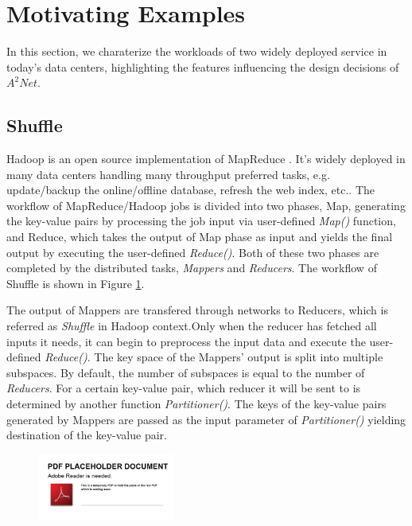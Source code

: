 \section{Motivating Examples}

In this section, we charaterize the workloads of two widely deployed service in today's data centers, highlighting the features influencing the design decisions of $A^2Net$.

\subsection{Shuffle}

Hadoop \cite{Hadoop} is an open source implementation of MapReduce \cite{MapReduce}. It's widely deployed in many data centers handling many throughput preferred tasks, e.g. update/backup the online/offline database, refresh the web index, etc.. The workflow of MapReduce/Hadoop jobs is divided into two phases, Map, generating the key-value pairs by processing the job input via user-defined \emph{Map()} function, and Reduce, which takes the output of Map phase as input and yields the final output by executing the user-defined \emph{Reduce()}. Both of these two phases are completed by the distributed tasks, \emph{Mappers} and \emph{Reducers}. The workflow of Shuffle is shown in Figure \ref{fig:shuffle}.

The output of Mappers are transfered through networks to Reducers, which is referred as \emph{Shuffle} in Hadoop context.Only when the reducer has fetched all inputs it needs, it can begin to preprocess the input data and execute the user-defined \emph{Reduce()}. The key space of the Mappers' output is split into multiple subspaces. By default, the number of subspaces is equal to the number of \emph{Reducers}. For a certain key-value pair, which reducer it will be sent to is determined by another function \emph{Partitioner()}. The keys of the key-value pairs generated by Mappers are passed as the input parameter of \emph{Partitioner()} yielding destination of the key-value pair.

\begin{figure}
  \centering
  \includegraphics[width=0.4\textwidth]{pic/placeholder}\\
  \caption{}
  \label{fig:shuffle}
\end{figure}


